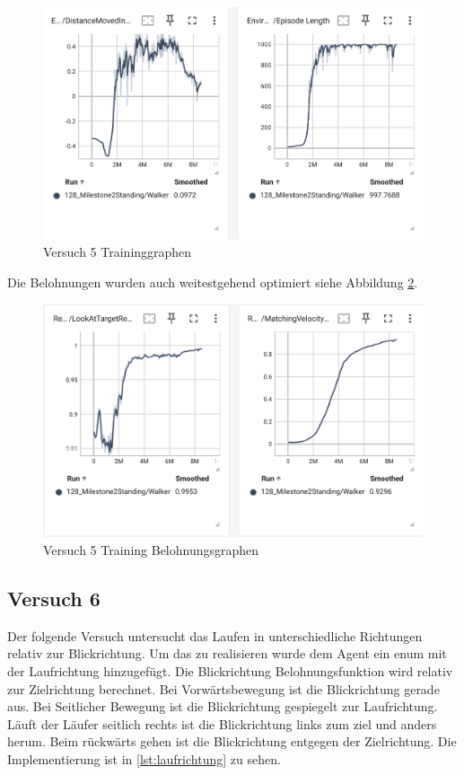 \begin{figure}[H]
  \centering  
  \includegraphics[scale=0.5]{img/versuch5_training.png}
  \caption{Versuch 5 Traininggraphen}
  \label{fig:versuch5_training}
\end{figure}

Die Belohnungen wurden auch weitestgehend optimiert siehe Abbildung \ref{fig:versuch5_training_belohnung}.

\begin{figure}[H]
  \centering  
  \includegraphics[scale=0.5]{img/versuch5_training_belohnung.png}
  \caption{Versuch 5 Training Belohnungsgraphen}
  \label{fig:versuch5_training_belohnung}
\end{figure}

\subsection{Versuch 6}
Der folgende Versuch untersucht das Laufen in unterschiedliche Richtungen relativ zur Blickrichtung. Um das zu realisieren wurde dem Agent ein enum mit der Laufrichtung hinzugefügt. Die Blickrichtung Belohnungsfunktion wird relativ zur Zielrichtung berechnet. Bei Vorwärtsbewegung ist die Blickrichtung gerade aus. Bei Seitlicher Bewegung ist die Blickrichtung gespiegelt zur Laufrichtung. Läuft der Läufer seitlich rechts ist die Blickrichtung links zum ziel und anders herum. Beim rückwärts gehen ist die Blickrichtung entgegen der Zielrichtung. Die Implementierung ist in \ref{lst:laufrichtung} zu sehen.

